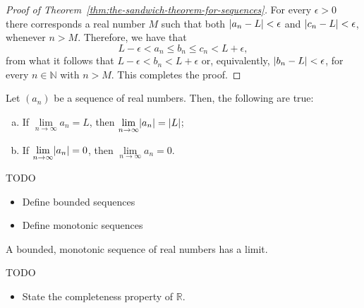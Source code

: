 \begin{proof}[Proof of Theorem~\ref{thm:the-sandwich-theorem-for-sequences}]
  For every $\epsilon>0$ there corresponds a real number $M$ such that both $\lvert a_{n}-L\rvert<\epsilon$ and $\lvert c_{n}-L\rvert<\epsilon$, whenever $n>M$. Therefore, we have that
  \[
    L-\epsilon<a_{n}\leqslant{b_{n}}\leqslant{c_{n}}<L+\epsilon,
  \]
  from what it follows that $L-\epsilon<b_{n}<L+\epsilon$ or, equivalently, $\lvert b_{n}-L\rvert<\epsilon$, for every $n\in\mathbb{N}$ with $n>M$. This completes the proof.
\end{proof}

\begin{proposition}
  Let $(a_{n})$ be a sequence of real numbers. Then, the following are true:
  \begin{enumerate}[(a)]
    \item
      If $\lim\limits_{n\to\infty}a_{n}=L$, then $\lim\limits_{n\to\infty}\lvert a_{n}\rvert=\lvert L\rvert$;
    \item
      If $\lim\limits_{n\to\infty}\lvert a_{n}\rvert=0$, then $\lim\limits_{n\to\infty}a_{n}=0$.
  \end{enumerate}
\end{proposition}

TODO

\begin{itemize}
  \item
    Define bounded sequences
  \item
    Define monotonic sequences
\end{itemize}

\begin{theorem}
  A bounded, monotonic sequence of real numbers has a limit.
\end{theorem}

TODO

\begin{itemize}
  \item
    State the completeness property of $\mathbb{R}$.
\end{itemize}
